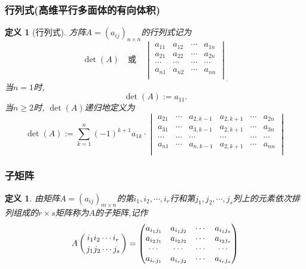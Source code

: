 \documentclass{article}
\newtheorem{definition}[theorem]{定义}
\renewcommand{\blue }[1]{{\textcolor[rgb]{0,0,1}{#1}}}
\begin{document}
\subsubsection{行列式(高维平行多面体的有向体积)}
\begin{definition}[行列式]
方阵$A=(a_{ij})_{n\times n}$的\blue{行列式}记为
\[\det(A) \quad \text{或} \quad
\begin{vmatrix}
a_{11}&a_{12}&\cdots&a_{1n}\\
a_{21}&a_{22}&\cdots&a_{2n}\\
\cdots&\cdots&\cdots&\cdots\\
a_{n1}&a_{n2}&\cdots&a_{nn}\\
\end{vmatrix}_.\]
当$n=1$时,
\[\det(A):=a_{11}.\]
当$n\geq2$时, $\det(A)$递归地定义为
\[\det(A):=\sum_{k=1}^n(-1)^{k+1}a_{1k}\cdot
\begin{vmatrix}
a_{21}&\cdots&a_{2,k-1}&a_{2,k+1}&\cdots&a_{2n}\\
a_{31}&\cdots&a_{3,k-1}&a_{2,k+1}&\cdots&a_{3n}\\
\cdots&\cdots&\cdots&\cdots&\cdots&\cdots\\
a_{n1}&\cdots&a_{n,k-1}&a_{2,k+1}&\cdots&a_{nn}\\
\end{vmatrix} \]
\end{definition}

\subsubsection{子矩阵}
\begin{definition}
由矩阵$A=(a_{ij})_{m\times n}$的第$i_1,i_2,\cdots,i_r$行和第$j_1,j_2,\cdots,j_s$列上的元素依次排列组成的$r\times s$矩阵称为$A$的\blue{子矩阵},记作
\[A\left({i_1i_2\cdots i_r\atop j_1j_2\cdots j_s}\right) = \begin{pmatrix}
a_{i_1j_1}&a_{i_1j_2}&\cdots&a_{i_1j_s}\\
a_{i_2j_1}&a_{i_2j_2}&\cdots&a_{i_2j_s}\\
\cdots&\cdots&\cdots&\cdots\\
a_{i_rj_1}&a_{i_rj_2}&\cdots&a_{i_rj_s}\\
\end{pmatrix}\]
\end{definition}
\end{document}
